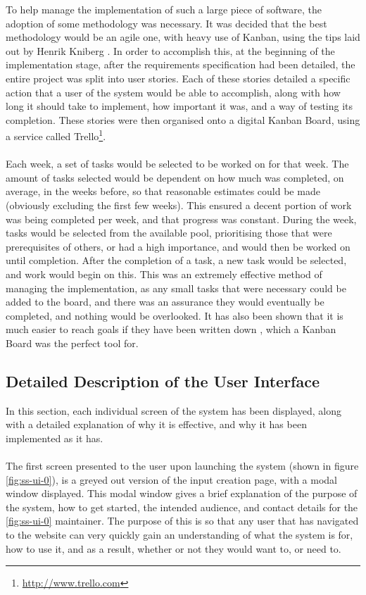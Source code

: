 To help manage the implementation of such a large piece of software, the adoption of some methodology was necessary. It was decided that the best methodology would be an agile one, with heavy use of Kanban, using the tips laid out by Henrik Kniberg \cite{kniberg2007scrum}. In order to accomplish this, at the beginning of the implementation stage, after the requirements specification had been detailed, the entire project was split into user stories. Each of these stories detailed a specific action that a user of the system would be able to accomplish, along with how long it should take to implement, how important it was, and a way of testing its completion. These stories were then organised onto a digital Kanban Board, using a service called Trello\footnote{\url{http://www.trello.com}}. \ \\
\ \\
Each week, a set of tasks would be selected to be worked on for that week. The amount of tasks selected would be dependent on how much was completed, on average, in the weeks before, so that reasonable estimates could be made (obviously excluding the first few weeks). This ensured a decent portion of work was being completed per week, and that progress was constant. During the week, tasks would be selected from the available pool, prioritising those that were prerequisites of others, or had a high importance, and would then be worked on until completion. After the completion of a task, a new task would be selected, and work would begin on this. This was an extremely effective method of managing the implementation, as any small tasks that were necessary could be added to the board, and there was an assurance they would eventually be completed, and nothing would be overlooked. It has also been shown that it is much easier to reach goals if they have been written down \cite{wilson2008goal}, which a Kanban Board was the perfect tool for.

\newpage 
\subsection{Detailed Description of the User Interface}
In this section, each individual screen of the system has been displayed, along with a detailed explanation of why it is effective, and why it has been implemented as it has.\ \\
\ \\
The first screen presented to the user upon launching the system (shown in figure \ref{fig:ss-ui-0}), is a greyed out version of the input creation page, with a modal window displayed. This modal window gives a brief explanation of the purpose of the system, how to get started, the intended audience, and contact details for the \ref{fig:ss-ui-0} maintainer. The purpose of this is so that any user that has navigated to the website can very quickly gain an understanding of what the system is for, how to use it, and as a result, whether or not they would want to, or need to.

